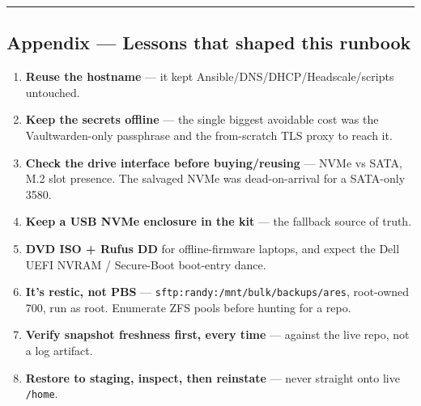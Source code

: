 \documentclass[
]{article}
\providecommand{\tightlist}{%
  \setlength{\itemsep}{0pt}\setlength{\parskip}{0pt}}
\begin{document}
\begin{center}\rule{0.5\linewidth}{0.5pt}\end{center}

\hypertarget{appendix-lessons-that-shaped-this-runbook}{%
\subsection{Appendix --- Lessons that shaped this
runbook}\label{appendix-lessons-that-shaped-this-runbook}}

\begin{enumerate}
\def\labelenumi{\arabic{enumi}.}
\tightlist
\item
  \textbf{Reuse the hostname} --- it kept
  Ansible/DNS/DHCP/Headscale/scripts untouched.
\item
  \textbf{Keep the secrets offline} --- the single biggest avoidable
  cost was the Vaultwarden-only passphrase and the from-scratch TLS
  proxy to reach it.
\item
  \textbf{Check the drive interface before buying/reusing} --- NVMe vs
  SATA, M.2 slot presence. The salvaged NVMe was dead-on-arrival for a
  SATA-only 3580.
\item
  \textbf{Keep a USB NVMe enclosure in the kit} --- the fallback source
  of truth.
\item
  \textbf{DVD ISO + Rufus DD} for offline-firmware laptops, and expect
  the Dell UEFI NVRAM / Secure-Boot boot-entry dance.
\item
  \textbf{It's restic, not PBS} ---
  \texttt{sftp:randy:/mnt/bulk/backups/ares}, root-owned 700, run as
  root. Enumerate ZFS pools before hunting for a repo.
\item
  \textbf{Verify snapshot freshness first, every time} --- against the
  live repo, not a log artifact.
\item
  \textbf{Restore to staging, inspect, then reinstate} --- never
  straight onto live \texttt{/home}.
\end{enumerate}
\end{document}
